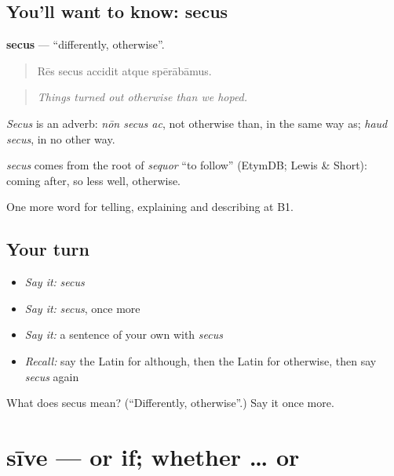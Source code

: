 \subsection*{You'll want to know: secus}
\textbf{secus} — \textquotedblleft{}differently, otherwise\textquotedblright{}.

\begin{quote}
Rēs secus accidit atque spērābāmus.
\end{quote}

\begin{quote}
\emph{Things turned out otherwise than we hoped.}
\end{quote}

\emph{Secus} is an adverb: \emph{nōn secus ac}, not otherwise than, in the same way as; \emph{haud secus}, in no other way.

\begin{cousinweb}
\emph{secus} comes from the root of \emph{sequor} \textquotedblleft{}to follow\textquotedblright{} (EtymDB; Lewis \& Short): coming after, so less well, otherwise.
\end{cousinweb}

\begin{grammarlens}[title={What you've built}]
One more word for telling, explaining and describing at B1.
\end{grammarlens}

\subsection*{Your turn}
\begin{itemize}
\raggedright
  \item \emph{Say it:} \emph{secus}
  \item \emph{Say it:} \emph{secus}, once more
  \item \emph{Say it:} a sentence of your own with \emph{secus}
  \item \emph{Recall:} say the Latin for although, then the Latin for otherwise, then say \emph{secus} again
\end{itemize}

\begin{tcolorbox}[breakable,colback=teal!4,colframe=teal!35!black,title={Before you move on}]
What does secus mean? (\textquotedblleft{}Differently, otherwise\textquotedblright{}.) Say it once more.
\end{tcolorbox}
\section[sīve]{sīve — or if; whether … or}

